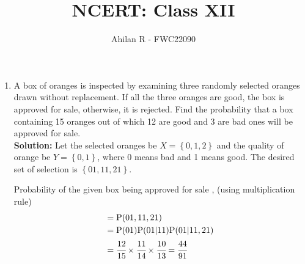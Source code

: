 \documentclass{article}
\providecommand{\cbrak}[1]{\ensuremath{\left\{#1\right\}}}
\newcommand{\solution}{\noindent \textbf{Solution: }}
\begin{document}
\title{NCERT: Class XII}
\author{\Large Ahilan R - FWC22090}
\date{}

\maketitle

\begin{enumerate}[label=13.\arabic{enumi}.\arabic{enumii}]

\setcounter{enumi}{1}
\setcounter{enumii}{3}

\item A box of oranges is inspected by examining three randomly selected oranges drawn without replacement. If all the three oranges are good, the box is approved for sale, otherwise, it is rejected. Find the probability that a box containing 15 oranges out of which 12 are good and 3 are bad ones will be approved for sale.\\[1ex]
	\solution
		Let the selected oranges be $X = \cbrak{0,1,2}$ and the quality of orange be $Y = \cbrak{0,1}$, where 0 means bad and 1 means good. The desired set of selection is \cbrak{01,11,21}.\\[-0.7cm]

	\begin{table}[h!]
	\small
	\centering
	
	\end{table}

		Probability of the given box being approved for sale , (using multiplication rule)	%
	\begin{align}
		=& \; \text{P}(01 , 11 , 21) \\
		=& \; \text{P}(01)\text{P}(01|11)\text{P}(01|11 , 21) \\
		=& \; \cfrac{12}{15}\times \cfrac{11}{14}\times \cfrac{10}{13}= \cfrac{44}{91}
	\end{align}

\end{enumerate}
\end{document}
